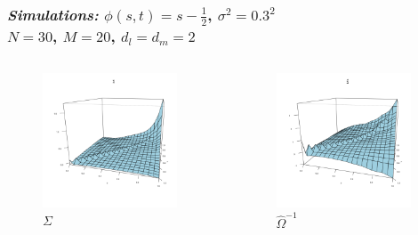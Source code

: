\documentclass[12pt]{beamer}
\begin{document}
\begin{frame}
\frametitle{\emph{Simulations: }$\phi\left(s,t\right) = s-\frac{1}{2}$, $\sigma^2 = 0.3^2$\\
$N = 30$, $M=20$, $d_l = d_m= 2$}

 \begin{columns}
\begin{column}{0.5\textwidth}
    \begin{center}
    \begin{figure}
    \graphicspath{{img/}}
 \includegraphics[width=4cm]{linear-vc-model-true-covariance}
 \caption{$\Sigma$ }
 \end{figure}
     \end{center}
  \end{column}
\begin{column}{0.5\textwidth}  %
    \begin{center}
    \begin{figure}
    \graphicspath{{img/}}
 \includegraphics[width=4cm]{linear-vc-model-estimated-covariance}
 \caption{$\hat{\Omega}^{-1}$}
 \end{figure}
     \end{center}
\end{column}
\end{columns}


\end{frame}
\end{document}
